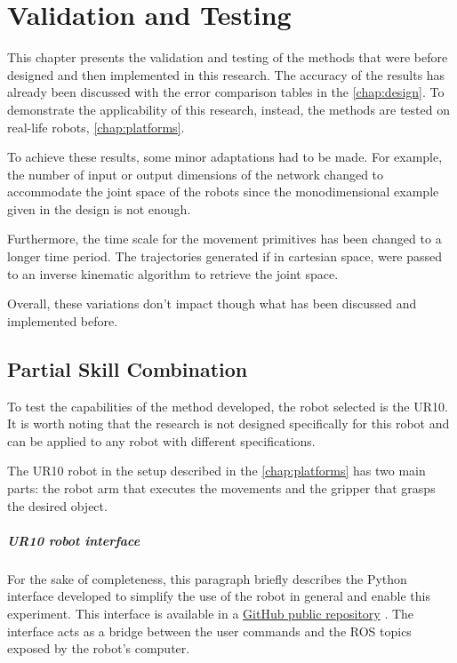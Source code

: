 \chapter{Validation and Testing} 
\label{chap:validation}

This chapter presents the validation and testing of the methods that were before designed and then implemented in this research. 
The accuracy of the results has already been discussed with the error comparison tables in the \cref{chap:design}.
To demonstrate the applicability of this research, instead, the methods are tested on real-life robots, \cref{chap:platforms}.

To achieve these results, some minor adaptations had to be made. For example, the number of input or output dimensions of the network changed to accommodate the joint space of the robots since the monodimensional example given in the design is not enough.

Furthermore, the time scale for the movement primitives has been changed to a longer time period.
The trajectories generated if in cartesian space, were passed to an inverse kinematic algorithm to retrieve the joint space.

Overall, these variations don't impact though what has been discussed and implemented before. 

\newpage
\section{Partial Skill Combination}
To test the capabilities of the method developed, the robot selected is the UR10. It is worth noting that the research is not designed specifically for this robot and can be applied to any robot with different specifications. 

The UR10 robot in the setup described in the \cref{chap:platforms} has two main parts: the robot arm that executes the movements and the gripper that grasps the desired object. 

\paragraph{UR10 robot interface} For the sake of completeness, this paragraph briefly describes the Python interface developed to simplify the use of the robot in general and enable this experiment. This interface is available in a \href{https://github.com/igor-lirussi/UR10_robot_interface}{GitHub public repository} \cite{url:UR10repo}. 
The interface acts as a bridge between the user commands and the ROS topics exposed by the robot's computer. 

